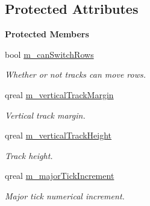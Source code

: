 \subsection*{Protected Attributes}
\begin{Indent}\textbf{ Protected Members}\par
\begin{DoxyCompactItemize}
\item 
\mbox{\label{classrev_1_1_view_1_1_timeline_scene_ace2c277b9d2b24d80974e0f0ba9aa187}} 
bool \mbox{\hyperlink{classrev_1_1_view_1_1_timeline_scene_ace2c277b9d2b24d80974e0f0ba9aa187}{m\+\_\+can\+Switch\+Rows}}
\begin{DoxyCompactList}\small\item\em Whether or not tracks can move rows. \end{DoxyCompactList}\item 
\mbox{\label{classrev_1_1_view_1_1_timeline_scene_a2b08501481bbdd7261ef07ed6c8628c6}} 
qreal \mbox{\hyperlink{classrev_1_1_view_1_1_timeline_scene_a2b08501481bbdd7261ef07ed6c8628c6}{m\+\_\+vertical\+Track\+Margin}}
\begin{DoxyCompactList}\small\item\em Vertical track margin. \end{DoxyCompactList}\item 
\mbox{\label{classrev_1_1_view_1_1_timeline_scene_acfa8a8f12f3b3291fbd28efe0aa6d661}} 
qreal \mbox{\hyperlink{classrev_1_1_view_1_1_timeline_scene_acfa8a8f12f3b3291fbd28efe0aa6d661}{m\+\_\+vertical\+Track\+Height}}
\begin{DoxyCompactList}\small\item\em Track height. \end{DoxyCompactList}\item 
\mbox{\label{classrev_1_1_view_1_1_timeline_scene_a1aa43ad613aa1cd68b46401546de8374}} 
qreal \mbox{\hyperlink{classrev_1_1_view_1_1_timeline_scene_a1aa43ad613aa1cd68b46401546de8374}{m\+\_\+major\+Tick\+Increment}}
\begin{DoxyCompactList}\small\item\em Major tick numerical increment. \end{DoxyCompactList}\item 

\end{DoxyCompactItemize}
\end{Indent}
